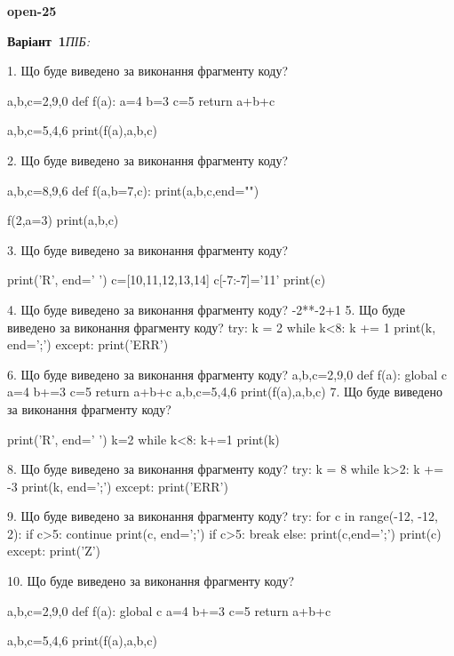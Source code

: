 \documentclass[11pt]{article}
\begin{document}
{\large\textbf{open-25}}

\textbf{Варіант \No\,1}\hfill \textit{ПІБ:}\,\underline{\hspace{60mm}}
\vspace{4mm}

1. Що буде виведено за виконання фрагменту коду?

a,b,c=2,9,0
def f(a):
    a=4
    b=3
    c=5
    return a+b+c

a,b,c=5,4,6
print(f(a),a,b,c)

2. Що буде виведено за виконання фрагменту коду?

a,b,c=8,9,6
def f(a,b=7,c):
    print(a,b,c,end="")

f(2,a=3)
print(a,b,c)


3. Що буде виведено за виконання фрагменту коду?

print('R', end=' ')
c=[10,11,12,13,14]
c[-7:-7]='11'
print(c)


4. Що буде виведено за виконання фрагменту коду?
-2**-2+1
5. Що буде виведено за виконання фрагменту коду?
try:
    k = 2
    while k<8:
        k += 1
    print(k, end=';')
except:
    print('ERR')

6. Що буде виведено за виконання фрагменту коду?
a,b,c=2,9,0
   def f(a):
     global c     a=4
     b+=3
     c=5
     return a+b+c
   a,b,c=5,4,6
   print(f(a),a,b,c)
7. Що буде виведено за виконання фрагменту коду?

print('R', end=' ')
k=2
while k<8:
    k+=1
print(k)


8. Що буде виведено за виконання фрагменту коду?
try:
    k = 8
    while k>2:
        k += -3
    print(k, end=';')
except:
    print('ERR')

9. Що буде виведено за виконання фрагменту коду?
try:
    for c in range(-12, -12, 2):
        if c>5:
            continue
        print(c, end=';')
        if c>5:
            break
    else:
        print(c,end=';')
    print(c)
except:
    print('Z')

10. Що буде виведено за виконання фрагменту коду?

a,b,c=2,9,0
def f(a):
global c    a=4
    b+=3
    c=5
    return a+b+c

a,b,c=5,4,6
print(f(a),a,b,c)
\end{document}
